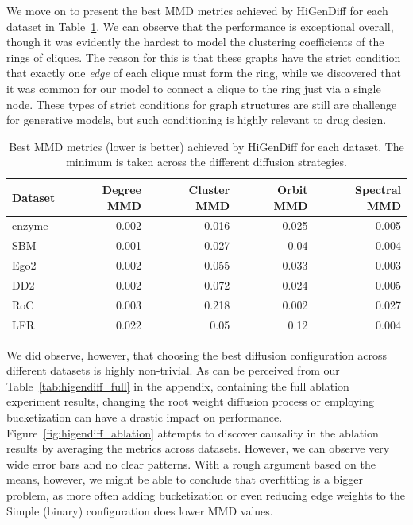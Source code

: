 We move on to present the best MMD metrics achieved by HiGenDiff for each dataset in Table~\ref{tab:higendiff_best}. We can observe that the performance is exceptional overall, though it was evidently the hardest to model the clustering coefficients of the rings of cliques. The reason for this is that these graphs have the strict condition that exactly one \emph{edge} of each clique must form the ring, while we discovered that it was common for our model to connect a clique to the ring just via a single node. These types of strict conditions for graph structures are still are challenge for generative models, but such conditioning is highly relevant to drug design.

\begin{table}[H]
    \centering
        \caption[Best MMD metrics achieved by HiGenDiff for each dataset.]{Best MMD metrics (lower is better) achieved by HiGenDiff for each dataset. The minimum is taken across the different diffusion strategies.}
    \label{tab:higendiff_best}
\begin{tabular}{lrrrr}
\toprule
Dataset & Degree MMD & Cluster MMD & Orbit MMD & Spectral MMD \\
\midrule
enzyme & 0.002 & 0.016 & 0.025 & 0.005 \\
SBM & 0.001 & 0.027 & 0.04 & 0.004 \\
Ego2 & 0.002 & 0.055 & 0.033 & 0.003 \\
DD2 & 0.002 & 0.072 & 0.024 & 0.005 \\
RoC & 0.003 & 0.218 & 0.002 & 0.027 \\
LFR & 0.022 & 0.05 & 0.12 & 0.004 \\
\bottomrule
\end{tabular}
\end{table}

We did observe, however, that choosing the best diffusion configuration across different datasets is highly non-trivial. As can be perceived from our Table~\ref{tab:higendiff_full} in the appendix, containing the full ablation experiment results, changing the root weight diffusion process or employing bucketization can have a drastic impact on performance. Figure~\ref{fig:higendiff_ablation} attempts to discover causality in the ablation results by averaging the metrics across datasets. However, we can observe very wide error bars and no clear patterns. With a rough argument based on the means, however, we might be able to conclude that overfitting is a bigger problem, as more often adding bucketization or even reducing edge weights to the Simple (binary) configuration does lower MMD values.

